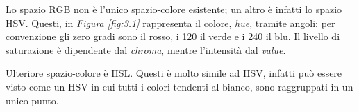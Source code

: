 \documentclass{subfiles}
\begin{document}
Lo spazio RGB non è l'unico spazio-colore esistente; un altro è infatti lo spazio HSV.
Questi, in \emph{Figura \ref{fig:3.1}} rappresenta il colore, \emph{hue}, tramite angoli: per convenzione gli zero gradi sono il rosso, i 120 il verde e i 240 il blu.
Il livello di saturazione è dipendente dal \emph{chroma}, mentre l'intensità dal \emph{value}.

Ulteriore spazio-colore è HSL. Questi è molto simile ad HSV, infatti può essere visto come un HSV in cui tutti i colori tendenti al bianco,
sono raggruppati in un unico punto.

\end{document}
